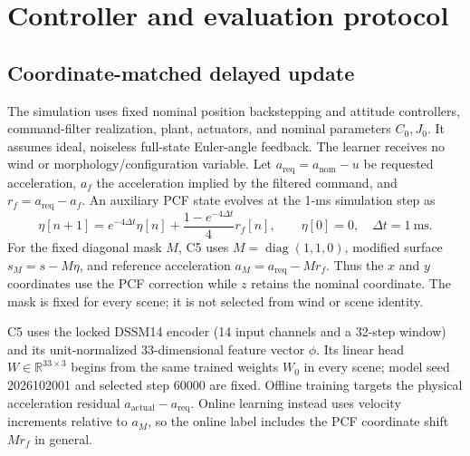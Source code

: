 \documentclass[11pt]{article}
\begin{document}
\section{Controller and evaluation protocol}
\subsection{Coordinate-matched delayed update}
The simulation uses fixed nominal position backstepping and attitude controllers, command-filter realization, plant, actuators, and nominal parameters $C_0,J_0$. It assumes ideal, noiseless full-state Euler-angle feedback. The learner receives no wind or morphology/configuration variable. Let $a_{\mathrm{req}}=a_{\mathrm{nom}}-u$ be requested acceleration, $a_f$ the acceleration implied by the filtered command, and $r_f=a_{\mathrm{req}}-a_f$. An auxiliary PCF state evolves at the 1-ms simulation step as
\begin{equation}
  \eta[n+1]=e^{-4\Delta t}\eta[n]
       +\frac{1-e^{-4\Delta t}}{4}r_f[n],
  \qquad \eta[0]=0, \quad \Delta t=1~\mathrm{ms}.
\end{equation}
For the fixed diagonal mask $M$, C5 uses $M=\operatorname{diag}(1,1,0)$, modified surface $s_M=s-M\eta$, and reference acceleration $a_M=a_{\mathrm{req}}-Mr_f$. Thus the $x$ and $y$ coordinates use the PCF correction while $z$ retains the nominal coordinate. The mask is fixed for every scene; it is not selected from wind or scene identity.

C5 uses the locked DSSM14 encoder (14 input channels and a 32-step window) and its unit-normalized 33-dimensional feature vector $\phi$. Its linear head $W\in\mathbb{R}^{33\times3}$ begins from the same trained weights $W_0$ in every scene; model seed 2026102001 and selected step 60000 are fixed. Offline training targets the physical acceleration residual $a_{\mathrm{actual}}-a_{\mathrm{req}}$. Online learning instead uses velocity increments relative to $a_M$, so the online label includes the PCF coordinate shift $Mr_f$ in general.
\end{document}
